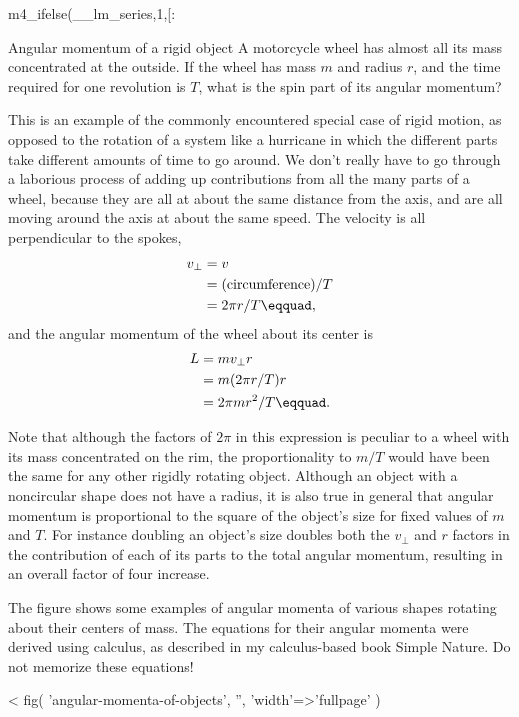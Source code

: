 m4_ifelse(__lm_series,1,[:
\pagebreak
\begin{eg}{Angular momentum of a rigid object}
\egquestion A motorcycle wheel has almost all its mass
concentrated at the outside. If the wheel has mass $m$ and
radius $r$, and the time required for one revolution is $T$,
what is the spin part of its angular momentum?

\eganswer This is an example of the commonly encountered
special case of rigid motion, as opposed to the rotation of
a system like a hurricane in which the different parts take
different amounts of time to go around. We don't really have
to go through a laborious process of adding up contributions
from all the many parts of a wheel, because they are all at
about the same distance from the axis, and are all moving
around the axis at about the same speed. The velocity is all
perpendicular to the spokes,
\begin{align*}
 v_\perp &= v \\
 &= (\text{circumference})/T \\
 &= 2\pi r/T\eqquad,
\end{align*}
and the angular momentum of the wheel about its center is
\begin{align*}
 L &= mv_{\perp}r \\
 &= m(2\pi r/T)r \\
 &= 2\pi mr^2/T\eqquad.
\end{align*}
\end{eg}

Note that although the factors of $2\pi $ in this expression
is peculiar to a wheel with its mass concentrated on the
rim, the proportionality to $m/T$ would have been the same
for any other rigidly rotating object. Although an object
with a noncircular shape does not have a radius, it is also
true in general that angular momentum is proportional to the
square of the object's size for fixed values of $m$ and $T$.
For instance doubling an object's size doubles both the $v_{\perp}$
and $r$ factors in the contribution of each of its parts to
the total angular momentum, resulting in an overall
factor of four increase.

The figure shows some examples of angular momenta of
various shapes rotating about their centers of mass. The
equations for their angular momenta were derived using
calculus, as described in my calculus-based book Simple
Nature. Do not memorize these equations!

<%
  fig(
    'angular-momenta-of-objects',
    '',
    {'width'=>'fullpage'}
  )

